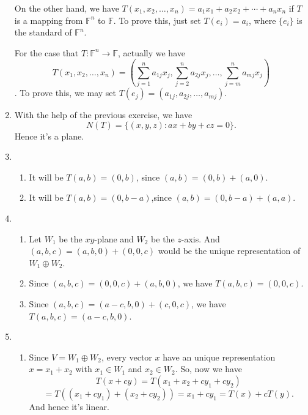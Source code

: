 \begin{enumerate}
On the other hand, we have $T(x_1,x_2,\ldots ,x_n)=a_1x_1+a_2x_2+\cdots +a_nx_n$ if $T$ is a mapping from $\mathbb{F}^n$ to $\mathbb{F}$. To prove this, just set $T(e_i)=a_i$, where $\{e_i\}$ is the standard of $\mathbb{F}^n$. 

For the case that $T:\mathbb{F}^n\rightarrow \mathbb{F} $, actually we have \[T(x_1,x_2,\ldots ,x_n)=(\sum_{j=1}^n{a_{1j}x_j},\sum_{j=2}^n{a_{2j}x_j},\ldots ,\sum_{j=m}^n{a_{mj}x_j})\]. To prove this, we may set $T(e_j)=(a_{1j},a_{2j},\ldots ,a_{mj})$.
\item With the help of the previous exercise, we have \[N(T)=\{(x,y,z):ax+by+cz=0\}.\] Hence it's a plane.
\item \begin{enumerate}
\item It will be $T(a,b)=(0,b)$, since $(a,b)=(0,b)+(a,0)$.
\item It will be $T(a,b)=(0,b-a)$,since $(a,b)=(0,b-a)+(a,a)$.
\end{enumerate}
\item \begin{enumerate}
\item Let $W_1$ be the $xy$-plane and $W_2$ be the $z$-axis. And $(a,b,c)=(a,b,0)+(0,0,c)$ would be the unique representation of $W_1\oplus W_2$.
\item Since $(a,b,c)=(0,0,c)+(a,b,0)$, we have $T(a,b,c)=(0,0,c)$.
\item Since $(a,b,c)=(a-c,b,0)+(c,0,c)$, we have $T(a,b,c)=(a-c,b,0)$.
\end{enumerate}
\item \begin{enumerate}
\item Since $V=W_1\oplus W_2$, every vector $x$ have an unique representation $x=x_1+x_2$ with $x_1\in W_1$ and $x_2\in W_2$.  So, now we have \[T(x+cy)=T(x_1+x_2+cy_1+cy_2)\]
\[=T((x_1+cy_1)+(x_2+cy_2))=x_1+cy_1=T(x)+cT(y).\]
And hence it's linear.


\end{enumerate}
\end{enumerate}
